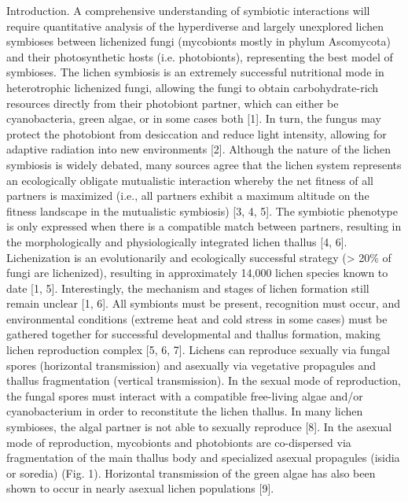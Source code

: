 \documentclass[runningheads,a4paper]{llncs}
\begin{document}
Introduction. 
A comprehensive understanding of symbiotic interactions will require quantitative analysis of the hyperdiverse and largely unexplored lichen symbioses between lichenized fungi (mycobionts mostly in phylum Ascomycota) and their photosynthetic hosts (i.e. photobionts), representing the best model of symbioses. The lichen symbiosis is an extremely successful nutritional mode in heterotrophic lichenized fungi, allowing the fungi to obtain carbohydrate-rich resources directly from their photobiont partner, which can either be cyanobacteria, green algae, or in some cases both [1]. In turn, the fungus may protect the photobiont from desiccation and reduce light intensity, allowing for adaptive radiation into new environments [2]. Although the nature of the lichen symbiosis is widely debated, many sources agree that the lichen system represents an ecologically obligate mutualistic interaction whereby the net fitness of all partners is maximized (i.e., all partners exhibit a maximum altitude on the fitness landscape in the mutualistic symbiosis) [3, 4, 5]. 
The symbiotic phenotype is only expressed when there is a compatible match between partners, resulting in the morphologically and physiologically integrated lichen thallus [4, 6]. Lichenization is an evolutionarily and ecologically successful strategy (> 20\% of fungi are lichenized), resulting in approximately 14,000  lichen species known to date [1, 5]. Interestingly, the mechanism and stages of lichen formation still remain unclear [1, 6]. All symbionts must be present, recognition must occur, and environmental conditions (extreme heat and cold stress in some cases) must be gathered together for successful developmental and thallus formation, making lichen reproduction complex [5, 6, 7]. Lichens can reproduce sexually via fungal spores (horizontal transmission) and asexually via vegetative propagules and thallus fragmentation (vertical transmission). In the sexual mode of reproduction, the fungal spores must interact with a compatible free-living algae and/or cyanobacterium in order to reconstitute the lichen thallus. In many lichen symbioses, the algal partner is not able to sexually reproduce [8]. In the asexual mode of reproduction, mycobionts and photobionts are co-dispersed via fragmentation of the main thallus body and specialized asexual propagules (isidia or soredia) (Fig. 1). Horizontal transmission of the green algae has also been shown to occur in nearly asexual lichen populations [9]. 
\end{document}
